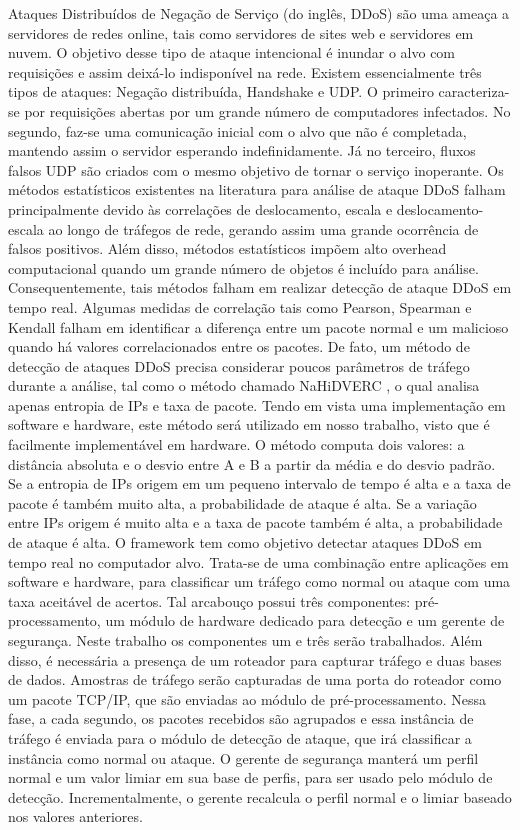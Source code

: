 Ataques Distribuídos de Negação de Serviço (do inglês, DDoS) são uma ameaça a servidores de redes online, tais como servidores de sites web e servidores em nuvem. O objetivo desse tipo de ataque intencional é inundar o alvo com requisições e assim deixá-lo indisponível na rede. Existem essencialmente três tipos de ataques: Negação distribuída, Handshake e UDP. O primeiro caracteriza-se por requisições abertas por um grande número de computadores infectados. No segundo, faz-se uma comunicação inicial com o alvo que não é completada, mantendo assim o servidor esperando indefinidamente. Já no terceiro, fluxos falsos UDP são criados com o mesmo objetivo de tornar o serviço inoperante. 
Os métodos estatísticos existentes na literatura para análise de ataque DDoS falham principalmente devido às correlações de deslocamento, escala e deslocamento-escala ao longo de tráfegos de rede, gerando assim uma grande ocorrência de falsos positivos. Além disso, métodos estatísticos impõem alto overhead computacional quando um grande número de objetos é incluído para análise. Consequentemente, tais métodos falham em realizar detecção de ataque DDoS em tempo real. Algumas medidas de correlação tais como Pearson, Spearman e Kendall falham em identificar a diferença entre um pacote normal e um malicioso quando há valores correlacionados entre os pacotes.
De fato, um método de detecção de ataques DDoS precisa considerar poucos parâmetros de tráfego durante a análise, tal como o método chamado NaHiDVERC \cite{HOQUE201748}, o qual analisa apenas entropia de IPs e taxa de pacote. Tendo em vista uma implementação em software e hardware, este método será utilizado em nosso trabalho, visto que é facilmente implementável em hardware. O método computa dois valores: a distância absoluta e o desvio entre A e B a partir da média e do desvio padrão. Se a entropia de IPs origem em um pequeno intervalo de tempo é alta e a taxa de pacote é também muito alta, a probabilidade de ataque é alta. Se a variação entre IPs origem é muito alta e a taxa de pacote também é alta, a probabilidade de ataque é alta. O framework tem como objetivo detectar ataques DDoS em tempo real no computador alvo. Trata-se de uma combinação entre aplicações em software e hardware, para classificar um tráfego como normal ou ataque com uma taxa aceitável de acertos. Tal arcabouço possui três componentes: pré-processamento, um módulo de hardware dedicado para detecção e um gerente de segurança. Neste trabalho os componentes um e três serão trabalhados. Além disso, é necessária a presença de um roteador para capturar tráfego e duas bases de dados. Amostras de tráfego serão capturadas de uma porta do roteador como um pacote TCP/IP, que são enviadas ao módulo de pré-processamento. Nessa fase, a cada segundo, os pacotes recebidos são agrupados e essa instância de tráfego é enviada para o módulo de detecção de ataque, que irá classificar a instância como normal ou ataque. O gerente de segurança manterá um perfil normal e um valor limiar em sua base de perfis, para ser usado pelo módulo de detecção. Incrementalmente, o gerente recalcula o perfil normal e o limiar baseado nos valores anteriores. 
